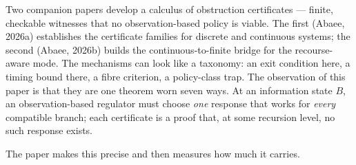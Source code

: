 \documentclass[10pt,twocolumn]{article}
\theoremstyle{definition}
\begin{document}
Two companion papers develop a calculus of obstruction certificates --- finite,
checkable witnesses that no observation-based policy is viable. The first
(Abaee, 2026a) establishes the certificate families for discrete and
continuous systems; the second (Abaee, 2026b) builds the
continuous-to-finite bridge for the recourse-aware mode. The mechanisms can
look like a taxonomy: an exit condition here, a timing bound there, a fibre
criterion, a policy-class trap. The observation of this paper is that they
are one theorem worn seven ways. At an information state \(B\), an
observation-based regulator must choose \emph{one} response that works for
\emph{every} compatible branch; each certificate is a proof that, at some
recursion level, no such response exists.

The paper makes this precise and then measures how much it carries.
\end{document}
